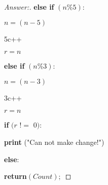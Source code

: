 \documentclass[11pt]{article}
\theoremstyle{definition}
\theoremstyle{definition}
\theoremstyle{definition}
\begin{document}
\begin{proof}[Answer:]
		\item	\hspace*{20mm} \textbf{else if} $(n \% 5):$
			\item	\hspace*{30mm} $n = (n-5)$
			\item	\hspace*{30mm} 5c++
			\item	\hspace*{30mm} $r = n$
			
		\item	\hspace*{20mm} \textbf{else if} $(n \% 3):$
			\item	\hspace*{30mm} $n = (n-3)$
			\item	\hspace*{30mm} 3c++
			\item	\hspace*{30mm} $r = n$

\item	\hspace*{10mm} \textbf{if} $(r$ $!=$ $0):$
\item	\hspace*{20mm} \textbf{print} ("Can not make change!")

\item	\hspace*{10mm} \textbf{else}:	
\item	\hspace*{20mm} \textbf{return}$(Count);$


	


\end{proof}




\end{document}
